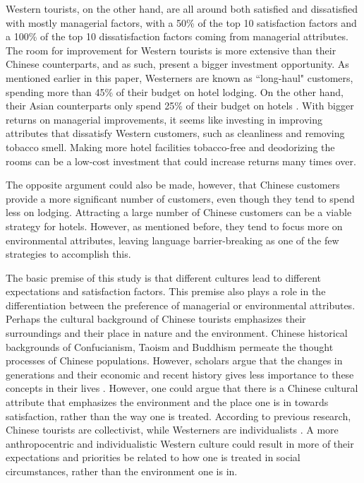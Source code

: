 \documentclass[smallextended,natbib]{svjour3}       %
\begin{document}
    Western tourists, on the other hand, are all around both satisfied and dissatisfied with mostly managerial factors, with a 50\% of the top 10 satisfaction factors and a 100\% of the top 10 dissatisfaction factors coming from managerial attributes. The room for improvement for Western tourists is more extensive than their Chinese counterparts, and as such, present a bigger investment opportunity. As mentioned earlier in this paper, Westerners are known as ``long-haul" customers, spending more than 45\% of their budget on hotel lodging. On the other hand, their Asian counterparts only spend 25\% of their budget on hotels \cite{choi2000}. With bigger returns on managerial improvements, it seems like investing in improving attributes that dissatisfy Western customers, such as cleanliness and removing tobacco smell. Making more hotel facilities tobacco-free and deodorizing the rooms can be a low-cost investment that could increase returns many times over. 

    The opposite argument could also be made, however, that Chinese customers provide a more significant number of customers, even though they tend to spend less on lodging. Attracting a large number of Chinese customers can be a viable strategy for hotels. However, as mentioned before, they tend to focus more on environmental attributes, leaving language barrier-breaking as one of the few strategies to accomplish this.

    The basic premise of this study is that different cultures lead to different expectations and satisfaction factors. This premise also plays a role in the differentiation between the preference of managerial or environmental attributes. Perhaps the cultural background of Chinese tourists emphasizes their surroundings and their place in nature and the environment. Chinese historical backgrounds of Confucianism, Taoism and Buddhism permeate the thought processes of Chinese populations. However, scholars argue that the changes in generations and their economic and recent history gives less importance to these concepts in their lives \cite{gao2017chinese}. However, one could argue that there is a Chinese cultural attribute that emphasizes the environment and the place one is in towards satisfaction, rather than the way one is treated. According to previous research, Chinese tourists are collectivist, while Westerners are individualists \cite{kim2000}. A more anthropocentric and individualistic Western culture could result in more of their expectations and priorities be related to how one is treated in social circumstances, rather than the environment one is in. 
\end{document}
